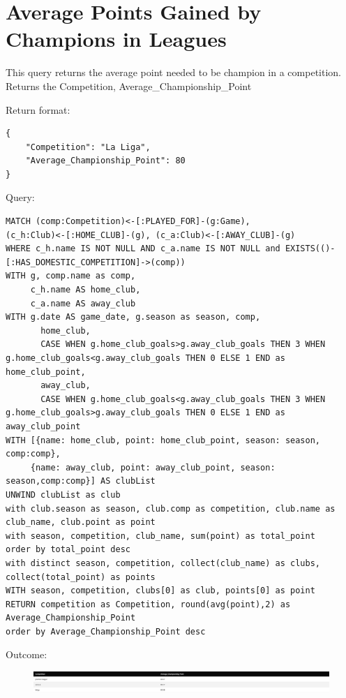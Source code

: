 \documentclass{Configuration_Files/PoliMi3i_thesis}
\begin{document}
\section{Average Points Gained by Champions in Leagues}
This query returns the average point needed to be champion in a competition.
Returns the Competition, Average\_Championship\_Point


Return format:
\begin{lstlisting}[style=json]
{
    "Competition": "La Liga",
    "Average_Championship_Point": 80
}
\end{lstlisting}


Query:

\begin{lstlisting}[language=Cypher]
MATCH (comp:Competition)<-[:PLAYED_FOR]-(g:Game),
(c_h:Club)<-[:HOME_CLUB]-(g), (c_a:Club)<-[:AWAY_CLUB]-(g)
WHERE c_h.name IS NOT NULL AND c_a.name IS NOT NULL and EXISTS(()-[:HAS_DOMESTIC_COMPETITION]->(comp))
WITH g, comp.name as comp,
     c_h.name AS home_club, 
     c_a.name AS away_club
WITH g.date AS game_date, g.season as season, comp,
       home_club, 
       CASE WHEN g.home_club_goals>g.away_club_goals THEN 3 WHEN g.home_club_goals<g.away_club_goals THEN 0 ELSE 1 END as home_club_point,
       away_club, 
       CASE WHEN g.home_club_goals<g.away_club_goals THEN 3 WHEN g.home_club_goals>g.away_club_goals THEN 0 ELSE 1 END as away_club_point
WITH [{name: home_club, point: home_club_point, season: season, comp:comp}, 
     {name: away_club, point: away_club_point, season: season,comp:comp}] AS clubList
UNWIND clubList as club
with club.season as season, club.comp as competition, club.name as club_name, club.point as point
with season, competition, club_name, sum(point) as total_point
order by total_point desc
with distinct season, competition, collect(club_name) as clubs, collect(total_point) as points
WITH season, competition, clubs[0] as club, points[0] as point
RETURN competition as Competition, round(avg(point),2) as Average_Championship_Point
order by Average_Championship_Point desc
\end{lstlisting}


Outcome:
\begin{figure}[H]
    \centering
    \includegraphics[width=\linewidth]{Project Template/Images/query_output/q15.png}
\end{figure}
\end{document}

